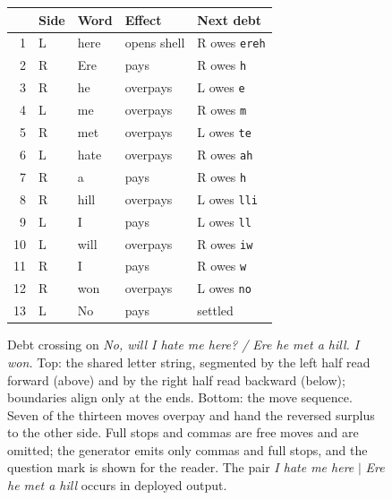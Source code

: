 \documentclass[11pt]{article}
\newcommand{\code}[1]{\texttt{#1}}
\newcommand{\w}[1]{\emph{#1}}
\begin{document}
\begin{figure}[t]
\centering
{}

\vspace{4pt}
\footnotesize
\setlength{\tabcolsep}{4pt}
\begin{tabular}{@{}r l l l l@{}}
\toprule
& Side & Word & Effect & Next debt \\
\midrule
1 & L & here & opens shell & R owes \code{ereh} \\
2 & R & Ere & pays & R owes \code{h} \\
3 & R & he & overpays & L owes \code{e} \\
4 & L & me & overpays & R owes \code{m} \\
5 & R & met & overpays & L owes \code{te} \\
6 & L & hate & overpays & R owes \code{ah} \\
7 & R & a & pays & R owes \code{h} \\
8 & R & hill & overpays & L owes \code{lli} \\
9 & L & I & pays & L owes \code{ll} \\
10 & L & will & overpays & R owes \code{iw} \\
11 & R & I & pays & R owes \code{w} \\
12 & R & won & overpays & L owes \code{no} \\
13 & L & No & pays & settled \\
\bottomrule
\end{tabular}
\caption{Debt crossing on \w{No, will I hate me here? / Ere he met a hill. I won.} Top: the shared letter string, segmented by the left half read forward (above) and by the right half read backward (below); boundaries align only at the ends. Bottom: the move sequence. Seven of the thirteen moves overpay and hand the reversed surplus to the other side. Full stops and commas are free moves and are omitted; the generator emits only commas and full stops, and the question mark is shown for the reader. The pair \w{I hate me here} $|$ \w{Ere he met a hill} occurs in deployed output.}
\label{fig:example}
\end{figure}
\end{document}
